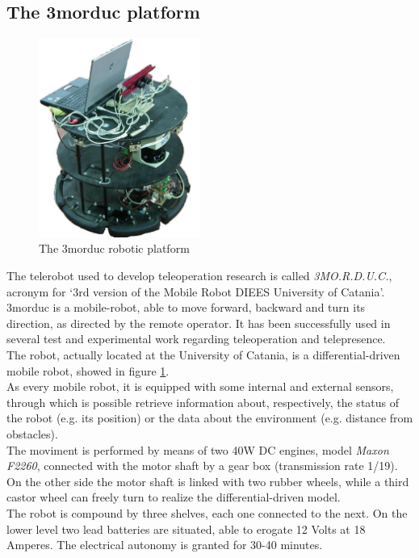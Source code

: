 \subsection{The 3morduc platform}
\label{sec:3morduc}

\begin{figure}
  \begin{center}
    \includegraphics[width=150pt]{img/3morduc.jpg}
    \caption{The 3morduc robotic platform}
    \label{fig:morduc}
  \end{center}
\end{figure}

The telerobot used to develop teleoperation research is
called \textit{3MO.R.D.U.C.}, acronym for `3rd version of
the Mobile Robot DIEES University of Catania'.
3morduc is a mobile-robot, able to move forward, backward
and turn its direction, as directed by the remote operator.
It has been successfully used in several test and experimental
work regarding teleoperation and telepresence.
\\
The robot, actually located at the University of
Catania, is a differential-driven mobile robot, showed
in figure \ref{fig:morduc}.
\\
As every mobile robot, it is equipped with some internal
and external sensors, through which is possible retrieve
information about, respectively, the status of the robot
(e.g. its position) or the data about the environment (e.g.
distance from obstacles).
\\
The moviment is performed by means of two 40W DC engines, model
\textit{Maxon F2260}, connected with the motor shaft by a gear
box (transmission rate 1/19). On the other side the motor shaft
is linked with two rubber wheels, while a third castor wheel can
freely turn to realize the differential-driven model.
\\
The robot is compound by three shelves, each one connected to
the next. On the lower level two lead batteries are situated,
able to erogate 12 Volts at 18 Amperes. The electrical autonomy is
granted for 30-40 minutes.

